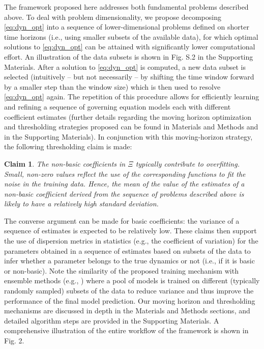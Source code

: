 \documentclass[12pt]{article}
\newtheorem{claim}{Claim}
\begin{document}
The framework proposed here addresses both fundamental problems described above. To deal with problem dimensionality,  we propose decomposing \eqref{eq:dyn_opt} into a sequence of lower-dimensional problems defined on shorter time horizons (i.e., using smaller subsets of the available data), for which optimal solutions to \eqref{eq:dyn_opt} can be attained with significantly lower computational effort. An illustration of the data subsets is shown in Fig. S.2 in the Supporting Materials. After a solution to \eqref{eq:dyn_opt} is computed, a new data subset is selected (intuitively -- but not necessarily -- by shifting the time window forward by a smaller step than the window size) which is then used to resolve \eqref{eq:dyn_opt} again. The repetition of this procedure allows for efficiently learning and refining a sequence of governing equation models each with different coefficient estimates (further details regarding the moving horizon optimization and thresholding strategies proposed can be found in Materials and Methods and in the Supporting Materials). In conjunction with this moving-horizon strategy, the following thresholding claim is made: 

\begin{claim}
The non-basic coefficients in $\Xi$  typically contribute to overfitting. Small, non-zero values reflect the use of the corresponding functions to fit the noise in the training data. Hence, the mean of the value of the estimates of a non-basic coefficient derived from the sequence of problems described above is likely to have a relatively high standard deviation. 
\end{claim}


The converse  argument can be made for basic coefficients: the variance of a sequence of estimates is expected to be relatively low. These claims then support the use of dispersion metrics in statistics (e.g., the coefficient of variation) for the parameters obtained in a sequence of estimates based on subsets of the data to infer whether a parameter belongs to the true dynamics or not (i.e., if it is basic or non-basic). Note the similarity of the proposed training mechanism with ensemble methods (e.g., \cite{ho1995random}) where a pool of models is trained on different (typically randomly sampled) subsets of the data to reduce variance and thus improve the performance of the final model prediction. Our moving horizon and thresholding mechanisms are discussed in depth in the Materials and Methods sections, and detailed algorithm steps are provided in the Supporting Materials. A comprehensive illustration of the entire workflow of the \ours{} framework is shown in Fig. 2.
\end{document}
